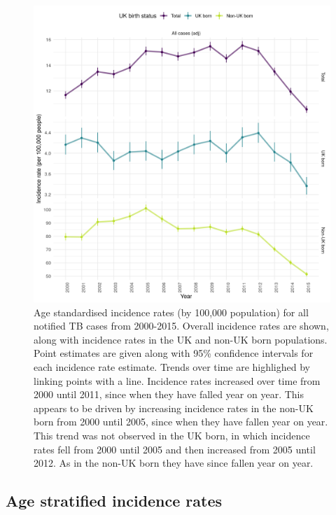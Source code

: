 \documentclass[11pt,twoside]{bristolthesis}
\begin{document}
  \begin{figure}
  
  {\centering \includegraphics[width=0.8\linewidth]{chapters/tb-epi-england/figures/plot-overall-inc-rates} 
  
  }
  
  \caption{Age standardised incidence rates (by 100,000 population) for all notified TB cases from 2000-2015. Overall incidence rates are shown, along with incidence rates in the UK and non-UK born populations. Point estimates are given along with 95\% confidence intervals for each incidence rate estimate. Trends over time are highlighed by linking points with a line. Incidence rates increased over time from 2000 until 2011, since when they have falled year on year. This appears to be driven by increasing incidence rates in the non-UK born from 2000 until 2005, since when they have fallen year on year. This trend was not observed in the UK born, in which incidence rates fell from 2000 until 2005 and then increased from 2005 until 2012. As in the non-UK born they have since fallen year on year.}\label{fig:plot-overall-inc-rates}
  \end{figure}
  \hypertarget{age-stratified-incidence-rates}{%
  \subsection{Age stratified incidence rates}\label{age-stratified-incidence-rates}}
  
\end{document}
